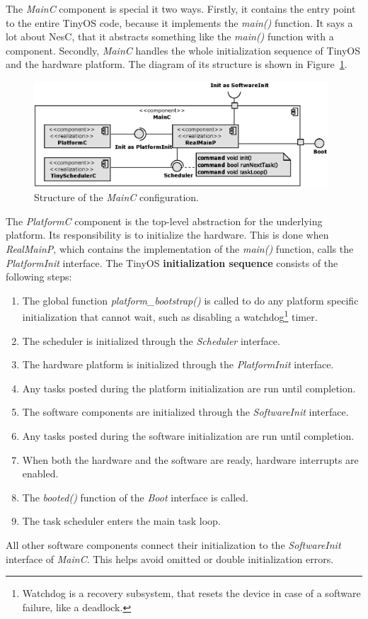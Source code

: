 The \emph{MainC} component is special it two ways. Firstly, it contains the entry point to the entire TinyOS code, because it implements the \emph{main()} function. It says a lot about NesC, that it abstracts something like the \emph{main()} function with a component. Secondly, \emph{MainC} handles the whole initialization sequence of TinyOS and the hardware platform. The diagram of its structure is shown in Figure~\ref{fig:mainc}.
\begin{figure}[h]
  \centering
  \includegraphics[width=0.98\textwidth]{diagrams/mainc.eps}
  \caption{Structure of the \emph{MainC} configuration.}
  \label{fig:mainc}
\end{figure}

The \emph{PlatformC} component is the top-level abstraction for the underlying platform. Its responsibility is to initialize the hardware. This is done when \emph{RealMainP}, which contains the implementation of the \emph{main()} function, calls the \emph{PlatformInit} interface. The TinyOS {\bf initialization sequence} consists of the following steps:
\begin{enumerate}
  \item The global function \emph{platform\_bootstrap()} is called to do any platform specific initialization that cannot wait, such as disabling a watchdog\footnote{Watchdog is a recovery subsystem, that resets the device in case of a software failure, like a deadlock.} timer.
  \item The scheduler is initialized through the \emph{Scheduler} interface.
  \item The hardware platform is initialized through the \emph{PlatformInit} interface.
  \item Any tasks posted during the platform initialization are run until completion.
  \item The software components are initialized through the \emph{SoftwareInit} interface.
  \item Any tasks posted during the software initialization are run until completion.
  \item When both the hardware and the software are ready, hardware interrupts are enabled.
  \item The \emph{booted()} function of the \emph{Boot} interface is called.
  \item The task scheduler enters the main task loop.
\end{enumerate}
All other software components connect their initialization to the \emph{SoftwareInit} interface of \emph{MainC}. This helps avoid omitted or double initialization errors.

